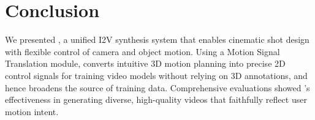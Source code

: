 \section{Conclusion}
\label{sec-6-conclusion}



We presented \MOCA, a unified I2V synthesis system that enables cinematic shot design with flexible control of camera and object motion. Using a Motion Signal Translation module, 
\MOCA converts intuitive 3D motion planning into precise 2D control signals for training video models without relying on 3D annotations, and hence broadens the source of training data. Comprehensive evaluations showed \MOCA's effectiveness in generating diverse, high-quality videos that faithfully reflect user motion intent.

